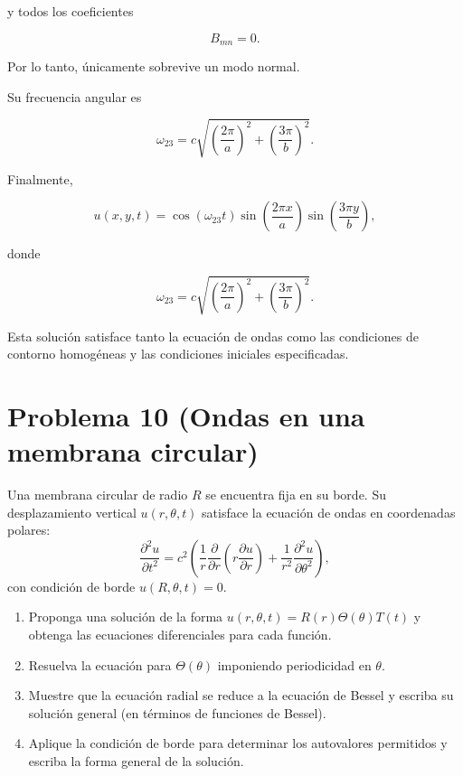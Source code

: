 \documentclass[12pt]{article}
\begin{document}
y todos los coeficientes

\[
B_{mn}=0.
\]

Por lo tanto, únicamente sobrevive un modo normal.

Su frecuencia angular es

\begin{equation}
\omega_{23}
=
c
\sqrt{
\left(\frac{2\pi}{a}\right)^2
+
\left(\frac{3\pi}{b}\right)^2
}.
\end{equation}

Finalmente,

\begin{equation}
\boxed{
u(x,y,t)
=
\cos(\omega_{23}t)
\sin\!\left(\frac{2\pi x}{a}\right)
\sin\!\left(\frac{3\pi y}{b}\right),
}
\end{equation}

donde

\begin{equation}
\boxed{
\omega_{23}
=
c
\sqrt{
\left(\frac{2\pi}{a}\right)^2
+
\left(\frac{3\pi}{b}\right)^2
}.
}
\end{equation}

Esta solución satisface tanto la ecuación de ondas como las condiciones de contorno homogéneas y las condiciones iniciales especificadas.








\section*{Problema 10 (Ondas en una membrana circular)}
Una membrana circular de radio \(R\) se encuentra fija en su borde. Su desplazamiento vertical \(u(r, \theta, t)\) satisface la ecuación de ondas en coordenadas polares:
\[
\frac{\partial^2 u}{\partial t^2} = c^2 \left( \frac{1}{r} \frac{\partial}{\partial r} \left( r \frac{\partial u}{\partial r} \right) + \frac{1}{r^2} \frac{\partial^2 u}{\partial \theta^2} \right),
\]
con condición de borde \(u(R, \theta, t) = 0\).
\begin{enumerate}
    \item[(a)] Proponga una solución de la forma \(u(r,\theta,t) = R(r)\Theta(\theta)T(t)\) y obtenga las ecuaciones diferenciales para cada función.
    \item[(b)] Resuelva la ecuación para \(\Theta(\theta)\) imponiendo periodicidad en \(\theta\).
    \item[(c)] Muestre que la ecuación radial se reduce a la ecuación de Bessel y escriba su solución general (en términos de funciones de Bessel).
    \item[(d)] Aplique la condición de borde para determinar los autovalores permitidos y escriba la forma general de la solución.
\end{enumerate}
\end{document}
